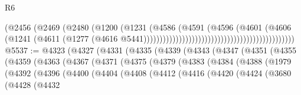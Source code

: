 \begin{lexlean}{R6}
\begin{coremodule}
                                                                      (@2456
                                                                        (@2469
                                                                          (@2480
                                                                            (@1200
                                                                              (@1231
                                                                                (@4586
                                                                                  (@4591
                                                                                    (@4596
                                                                                      (@4601
                                                                                        (@4606
                                                                                          (@1241
                                                                                            (@4611
                                                                                              (@1277
                                                                                                (@4616
                                                                                                  @5441)))))))))))))))))))))))))))))))))))))))))))))))
@5537 := @4323
    (@4327
      (@4331
        (@4335
          (@4339
            (@4343
              (@4347
                (@4351
                  (@4355
                    (@4359
                      (@4363
                        (@4367
                          (@4371
                            (@4375
                              (@4379
                                (@4383
                                  (@4384
                                    (@4388
                                      (@1979
                                        (@4392
                                          (@4396
                                            (@4400
                                              (@4404
                                                (@4408
                                                  (@4412
                                                    (@4416
                                                      (@4420
                                                        (@4424
                                                          (@3680
                                                            (@4428
                                                              (@4432

\end{coremodule}
\end{lexlean}

